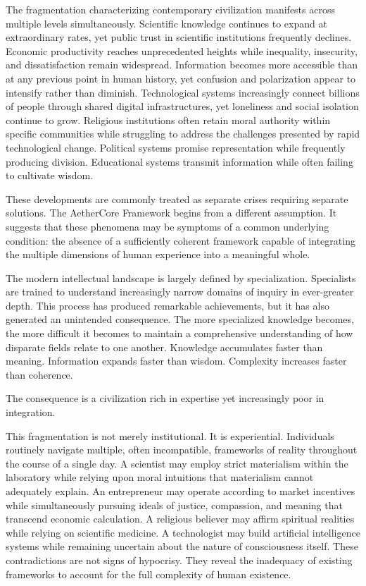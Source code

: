 \documentclass[12pt]{article}
\begin{document}
The fragmentation characterizing contemporary civilization manifests across multiple levels simultaneously. Scientific knowledge continues to expand at extraordinary rates, yet public trust in scientific institutions frequently declines. Economic productivity reaches unprecedented heights while inequality, insecurity, and dissatisfaction remain widespread. Information becomes more accessible than at any previous point in human history, yet confusion and polarization appear to intensify rather than diminish. Technological systems increasingly connect billions of people through shared digital infrastructures, yet loneliness and social isolation continue to grow. Religious institutions often retain moral authority within specific communities while struggling to address the challenges presented by rapid technological change. Political systems promise representation while frequently producing division. Educational systems transmit information while often failing to cultivate wisdom.

These developments are commonly treated as separate crises requiring separate solutions. The AetherCore Framework begins from a different assumption. It suggests that these phenomena may be symptoms of a common underlying condition: the absence of a sufficiently coherent framework capable of integrating the multiple dimensions of human experience into a meaningful whole.

The modern intellectual landscape is largely defined by specialization. Specialists are trained to understand increasingly narrow domains of inquiry in ever-greater depth. This process has produced remarkable achievements, but it has also generated an unintended consequence. The more specialized knowledge becomes, the more difficult it becomes to maintain a comprehensive understanding of how disparate fields relate to one another. Knowledge accumulates faster than meaning. Information expands faster than wisdom. Complexity increases faster than coherence.

The consequence is a civilization rich in expertise yet increasingly poor in integration.

This fragmentation is not merely institutional. It is experiential. Individuals routinely navigate multiple, often incompatible, frameworks of reality throughout the course of a single day. A scientist may employ strict materialism within the laboratory while relying upon moral intuitions that materialism cannot adequately explain. An entrepreneur may operate according to market incentives while simultaneously pursuing ideals of justice, compassion, and meaning that transcend economic calculation. A religious believer may affirm spiritual realities while relying on scientific medicine. A technologist may build artificial intelligence systems while remaining uncertain about the nature of consciousness itself. These contradictions are not signs of hypocrisy. They reveal the inadequacy of existing frameworks to account for the full complexity of human existence.
\end{document}
